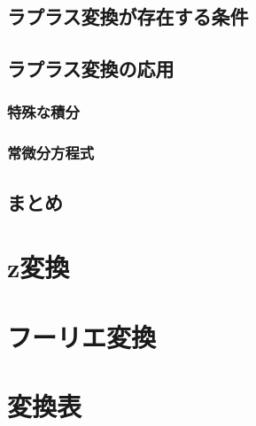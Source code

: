\documentclass[uplatex, dvipdfmx, fleqn, a4paper, 10pt]{ujreport}
\begin{document}
\subsection{ラプラス変換が存在する条件}

\subsection{ラプラス変換の応用}

\subsubsection{特殊な積分}

\subsubsection{常微分方程式}

\subsection{まとめ}

\section{z変換}\label{sec:z_transform}

\section{フーリエ変換}\label{sec:fourier_transform}

\section{変換表}

\newpage
\end{document}
